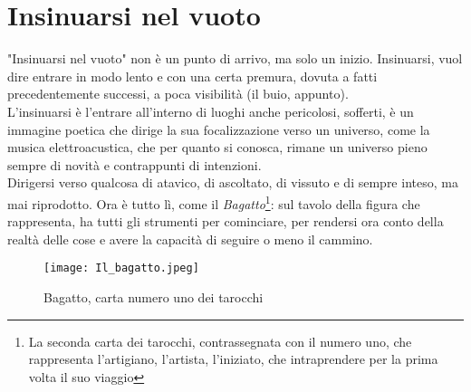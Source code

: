 
\section{Insinuarsi nel vuoto}

"Insinuarsi nel vuoto" non è un punto di arrivo, ma solo un inizio. Insinuarsi, vuol dire entrare in modo lento e con una certa premura, dovuta a fatti precedentemente successi, a poca visibilità (il buio, appunto). \\
L'insinuarsi è l'entrare all'interno di luoghi anche pericolosi, sofferti, è un immagine poetica che dirige la sua focalizzazione verso un universo, come la musica elettroacustica, che per quanto si conosca, rimane un universo pieno sempre di novità e contrappunti di intenzioni. \\
Dirigersi verso qualcosa di atavico, di ascoltato, di vissuto e di sempre inteso, ma mai riprodotto. Ora è tutto lì, come il \textit{Bagatto}\footnote{La seconda carta dei tarocchi, contrassegnata con il numero uno, che rappresenta l'artigiano, l'artista, l'iniziato, che intraprendere per la prima volta il suo viaggio}: sul tavolo della figura che rappresenta, ha tutti gli strumenti per cominciare, per rendersi ora conto della realtà delle cose e avere la capacità di seguire o meno il cammino.
\begin{figure}

\begin{center}

\texttt{[image: Il\_bagatto.jpeg]}

\caption{Bagatto, carta numero uno dei tarocchi}

\label{fig:il bagatto}

\end{center}

\end{figure}
